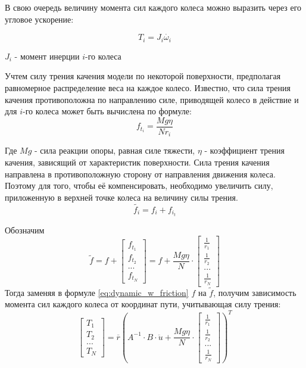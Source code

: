 \documentclass[oneside,final,14pt]{extreport}
\begin{document}
В свою очередь величину момента сил каждого колеса можно выразить через его угловое ускорение:

\begin{equation}
T_{i}
=
J_{i}\dot{\omega_{i}}
\end{equation}

$J_{i}$ - момент инерции $i$-го колеса

Учтем силу трения качения модели по некоторой поверхности, предполагая равномерное распределение веса на каждое колесо. Известно, что сила трения качения противоположна по направлению силе, приводящей колесо в действие и для $i$-го колеса может быть вычислена по формуле:
\begin{equation}
f_{t_{i}}
=
\frac{Mg\eta}{Nr_{i}}
\end{equation}

Где $Mg$ - сила реакции опоры, равная силе тяжести, $\eta$ - коэффициент трения качения, зависящий от характеристик поверхности. 
Сила трения качения направлена в противоположную сторону от направления движения колеса. Поэтому для того, чтобы её компенсировать, необходимо увеличить силу, приложенную в верхней точке колеса на величину силы трения.
\begin{equation}
\tilde{f_{i}}
=
f_{i}
+
f_{i_{t}}
\end{equation}

Обозначим 
\begin{equation}
\tilde{f}
=
f
+
\begin{bmatrix}
f_{t_{1}} \\
f_{t_{2}} \\
... \\
f_{t_{N}}
\end{bmatrix}
=
f
+
\frac{Mg\eta}{N}
\cdot
\begin{bmatrix}
\frac{1}{r_{1}} \\
\frac{1}{r_{2}} \\
...				\\
\frac{1}{r_{N}}
\end{bmatrix}
\end{equation}
Тогда заменяя в формуле \ref{eq:dynamic_w_friction} $f$ на $\tilde{f}$, получим зависимость момента сил каждого колеса от координат пути, учитывающая силу трения:
\begin{equation}
\begin{bmatrix}
T_{1} \\
T_{2} \\
... \\
T_{N}
\end{bmatrix}
=
\overline{r}
(
A^{-1}
\cdot
B 
\cdot
\ddot{u}
+
\frac{Mg\eta}{N}
\cdot
\begin{bmatrix}
\frac{1}{r_{1}} \\
\frac{1}{r_{2}} \\
...				\\
\frac{1}{r_{N}}
\end{bmatrix}
)^{T}
\end{equation} 
\end{document}
